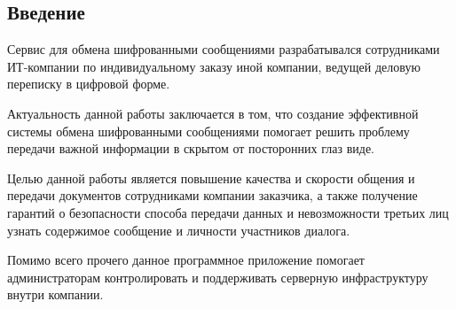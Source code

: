 \subsection{Введение}
\label{sec:economics:intro}

Сервис для обмена шифрованными сообщениями разрабатывался сотрудниками ИТ-компании по индивидуальному заказу иной компании, ведущей деловую переписку в цифровой форме.

Актуальность данной работы заключается в том, что создание эффективной системы обмена шифрованными сообщениями помогает решить проблему передачи важной информации в скрытом от посторонних глаз виде.

Целью данной работы является повышение качества и скорости общения и передачи документов сотрудниками компании заказчика, а также получение гарантий о безопасности способа передачи данных и невозможности третьих лиц узнать содержимое сообщение и личности участников диалога.

Помимо всего прочего данное программное приложение помогает администраторам контролировать и поддерживать серверную инфраструктуру внутри компании.